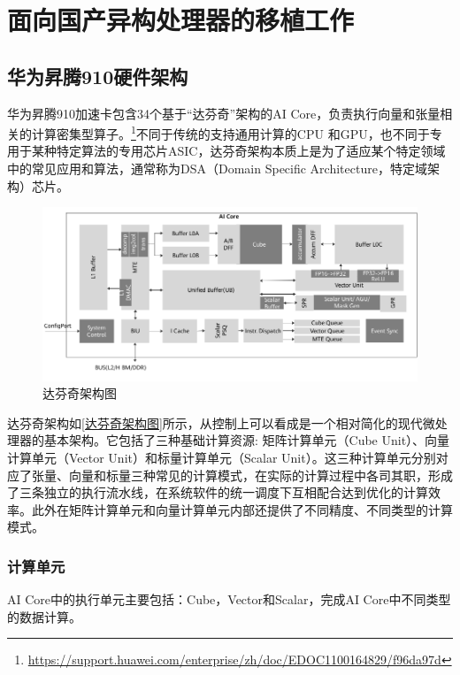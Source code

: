 \chapter{面向国产异构处理器的移植工作}
\label{面向国产异构处理器的移植工作}

\section{华为昇腾910硬件架构}
\label{华为昇腾910硬件架构}

华为昇腾910加速卡包含34个基于``达芬奇''架构的AI Core，负责执行向量和张量相关的计算密集型算子。\footnote{\url{https://support.huawei.com/enterprise/zh/doc/EDOC1100164829/f96da97d}}不同于传统的支持通用计算的CPU 和GPU，也不同于专用于某种特定算法的专用芯片ASIC，达芬奇架构本质上是为了适应某个特定领域中的常见应用和算法，通常称为DSA（Domain Specific Architecture，特定域架构）芯片。

\begin{figure}[h]
    \centering
    \includegraphics[width=1\textwidth]{image/chap03/davinci.png}
    \caption{达芬奇架构图}
    \label{达芬奇架构图}
\end{figure}

达芬奇架构如\autoref{达芬奇架构图}所示，从控制上可以看成是一个相对简化的现代微处理器的基本架构。它包括了三种基础计算资源: 矩阵计算单元（Cube Unit）、向量计算单元（Vector Unit）和标量计算单元（Scalar Unit）。这三种计算单元分别对应了张量、向量和标量三种常见的计算模式，在实际的计算过程中各司其职，形成了三条独立的执行流水线，在系统软件的统一调度下互相配合达到优化的计算效率。此外在矩阵计算单元和向量计算单元内部还提供了不同精度、不同类型的计算模式。

\subsection{计算单元}

AI Core中的执行单元主要包括：Cube，Vector和Scalar，完成AI Core中不同类型的数据计算。

